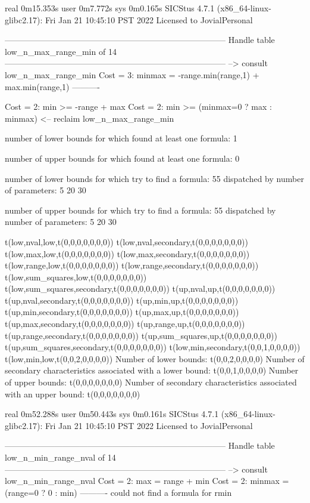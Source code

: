 real	0m15.353s
user	0m7.772s
sys	0m0.165s
SICStus 4.7.1 (x86_64-linux-glibc2.17): Fri Jan 21 10:45:10 PST 2022
Licensed to JovialPersonal


--------------------------------------------------------------------------------
Handle table low_n_max_range_min of 14
--------------------------------------------------------------------------------
--> consult low_n_max_range_min
Cost =  3:  minmax = -range.min(range,1) + max.min(range,1)
----------

Cost =  2:  min >= -range + max
Cost =  2:  min >= (minmax=0 ? max : minmax)
<-- reclaim low_n_max_range_min

number of lower bounds for which found at least one formula: 1

number of upper bounds for which found at least one formula: 0

number of lower bounds for which try to find a formula: 55
dispatched by number of parameters: 5  20  30

number of upper bounds for which try to find a formula: 55
dispatched by number of parameters: 5  20  30

t(low,nval,low,t(0,0,0,0,0,0,0))
t(low,nval,secondary,t(0,0,0,0,0,0,0))
t(low,max,low,t(0,0,0,0,0,0,0))
t(low,max,secondary,t(0,0,0,0,0,0,0))
t(low,range,low,t(0,0,0,0,0,0,0))
t(low,range,secondary,t(0,0,0,0,0,0,0))
t(low,sum_squares,low,t(0,0,0,0,0,0,0))
t(low,sum_squares,secondary,t(0,0,0,0,0,0,0))
t(up,nval,up,t(0,0,0,0,0,0,0))
t(up,nval,secondary,t(0,0,0,0,0,0,0))
t(up,min,up,t(0,0,0,0,0,0,0))
t(up,min,secondary,t(0,0,0,0,0,0,0))
t(up,max,up,t(0,0,0,0,0,0,0))
t(up,max,secondary,t(0,0,0,0,0,0,0))
t(up,range,up,t(0,0,0,0,0,0,0))
t(up,range,secondary,t(0,0,0,0,0,0,0))
t(up,sum_squares,up,t(0,0,0,0,0,0,0))
t(up,sum_squares,secondary,t(0,0,0,0,0,0,0))
t(low,min,secondary,t(0,0,1,0,0,0,0))
t(low,min,low,t(0,0,2,0,0,0,0))
Number of lower bounds:                                             t(0,0,2,0,0,0,0)
Number of secondary characteristics associated with a lower bound:  t(0,0,1,0,0,0,0)
Number of upper bounds:                                             t(0,0,0,0,0,0,0)
Number of secondary characteristics associated with an upper bound: t(0,0,0,0,0,0,0)

real	0m52.288s
user	0m50.443s
sys	0m0.161s
SICStus 4.7.1 (x86_64-linux-glibc2.17): Fri Jan 21 10:45:10 PST 2022
Licensed to JovialPersonal


--------------------------------------------------------------------------------
Handle table low_n_min_range_nval of 14
--------------------------------------------------------------------------------
--> consult low_n_min_range_nval
Cost =  2:  max    = range + min
Cost =  2:  minmax = (range=0 ? 0 : min)
----------
could not find a formula for rmin

